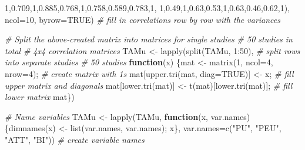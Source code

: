 \documentclass[
]{book}
\newenvironment{Shaded}{\begin{snugshade}}{\end{snugshade}}
\newcommand{\AttributeTok}[1]{\textcolor[rgb]{0.77,0.63,0.00}{#1}}
\newcommand{\CommentTok}[1]{\textcolor[rgb]{0.56,0.35,0.01}{\textit{#1}}}
\newcommand{\ConstantTok}[1]{\textcolor[rgb]{0.00,0.00,0.00}{#1}}
\newcommand{\ControlFlowTok}[1]{\textcolor[rgb]{0.13,0.29,0.53}{\textbf{#1}}}
\newcommand{\DecValTok}[1]{\textcolor[rgb]{0.00,0.00,0.81}{#1}}
\newcommand{\FloatTok}[1]{\textcolor[rgb]{0.00,0.00,0.81}{#1}}
\newcommand{\FunctionTok}[1]{\textcolor[rgb]{0.00,0.00,0.00}{#1}}
\newcommand{\NormalTok}[1]{#1}
\newcommand{\OtherTok}[1]{\textcolor[rgb]{0.56,0.35,0.01}{#1}}
\newcommand{\SpecialCharTok}[1]{\textcolor[rgb]{0.00,0.00,0.00}{#1}}
\newcommand{\StringTok}[1]{\textcolor[rgb]{0.31,0.60,0.02}{#1}}
\begin{document}
\begin{Shaded}
\begin{Highlighting}[]
        \DecValTok{1}\NormalTok{,}\FloatTok{0.709}\NormalTok{,}\DecValTok{1}\NormalTok{,}\FloatTok{0.885}\NormalTok{,}\FloatTok{0.768}\NormalTok{,}\DecValTok{1}\NormalTok{,}\FloatTok{0.758}\NormalTok{,}\FloatTok{0.589}\NormalTok{,}\FloatTok{0.783}\NormalTok{,}\DecValTok{1}\NormalTok{,}
        \DecValTok{1}\NormalTok{,}\FloatTok{0.49}\NormalTok{,}\DecValTok{1}\NormalTok{,}\FloatTok{0.63}\NormalTok{,}\FloatTok{0.53}\NormalTok{,}\DecValTok{1}\NormalTok{,}\FloatTok{0.63}\NormalTok{,}\FloatTok{0.46}\NormalTok{,}\FloatTok{0.62}\NormalTok{,}\DecValTok{1}\NormalTok{),}
    \AttributeTok{ncol=}\DecValTok{10}\NormalTok{, }\AttributeTok{byrow=}\ConstantTok{TRUE}\NormalTok{)    }\CommentTok{\# fill in correlations row by row with the variances}

\CommentTok{\# Split the above{-}created matrix into matrices for single studies}
\CommentTok{\# 50 studies in total}
\CommentTok{\# 4x4 correlation matrices}
\NormalTok{TAMu }\OtherTok{\textless{}{-}} \FunctionTok{lapply}\NormalTok{(}\FunctionTok{split}\NormalTok{(TAMu, }\DecValTok{1}\SpecialCharTok{:}\DecValTok{50}\NormalTok{), }\CommentTok{\# split rows into separate studies}
                                  \CommentTok{\# 50 studies }
                   \ControlFlowTok{function}\NormalTok{(x) \{mat }\OtherTok{\textless{}{-}} \FunctionTok{matrix}\NormalTok{(}\DecValTok{1}\NormalTok{, }\AttributeTok{ncol=}\DecValTok{4}\NormalTok{, }\AttributeTok{nrow=}\DecValTok{4}\NormalTok{);   }\CommentTok{\# create matrix with 1\textquotesingle{}s}
\NormalTok{                   mat[}\FunctionTok{upper.tri}\NormalTok{(mat, }\AttributeTok{diag=}\ConstantTok{TRUE}\NormalTok{)] }\OtherTok{\textless{}{-}}\NormalTok{ x;     }\CommentTok{\# fill upper matrix and diagonals}
\NormalTok{                   mat[}\FunctionTok{lower.tri}\NormalTok{(mat)] }\OtherTok{\textless{}{-}} \FunctionTok{t}\NormalTok{(mat)[}\FunctionTok{lower.tri}\NormalTok{(mat)];   }\CommentTok{\# fill lower matrix}
\NormalTok{                   mat\})}

\CommentTok{\# Name variables}
\NormalTok{TAMu }\OtherTok{\textless{}{-}} \FunctionTok{lapply}\NormalTok{(TAMu, }\ControlFlowTok{function}\NormalTok{(x, var.names) \{}\FunctionTok{dimnames}\NormalTok{(x) }\OtherTok{\textless{}{-}} \FunctionTok{list}\NormalTok{(var.names, var.names); x\},}
                   \AttributeTok{var.names=}\FunctionTok{c}\NormalTok{(}\StringTok{"PU"}\NormalTok{, }\StringTok{"PEU"}\NormalTok{, }\StringTok{"ATT"}\NormalTok{, }\StringTok{"BI"}\NormalTok{))   }\CommentTok{\# create variable names                }


\end{Highlighting}
\end{Shaded}
\end{document}
